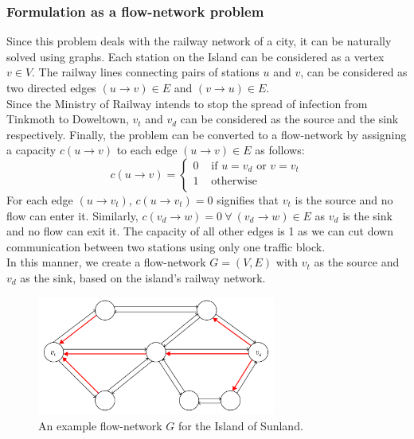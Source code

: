 \documentclass[12pt]{report}
\begin{document}
    \subsubsection*{Formulation as a flow-network problem}
    Since this problem deals with the railway network of a city, it can be naturally solved using graphs.
    Each station on the Island can be considered as a vertex $v \in V$.
    The railway lines connecting pairs of stations $u$ and $v$, can be considered as two directed edges $(u \to v) \in E$ and $(v \to u) \in E$. \\
    Since the Ministry of Railway intends to stop the spread of infection from Tinkmoth to Doweltown, $v_{t}$ and $v_{d}$
    can be considered as the source and the sink respectively.
    Finally, the problem can be converted to a flow-network by assigning a capacity $c(u \to v)$ to each edge $(u \to v) \in E$ as follows:
    \begin{equation}
        \label{eq:capacity}
        c(u \to v) = \begin{cases}
            0 & \text{ if $u = v_{d}$ or $v = v_{t}$} \\
            1 & \text{ otherwise} \\
        \end{cases}
    \end{equation}
    For each edge $(u \to v_{t})$, $c(u \to v_{t}) = 0$ signifies that $v_{t}$ is the source and no flow can enter it.
    Similarly, $c(v_{d} \to w) = 0 \ \forall \ (v_{d} \to w) \in E$ as $v_{d}$ is the sink and no flow can exit it.
    The capacity of all other edges is 1 as we can cut down communication between two stations using only one traffic block. \\
    In this manner, we create a flow-network $G = (V, E)$ with $v_{t}$ as the source and $v_{d}$ as the sink, based on the island's railway network. \hfill
    \begin{figure}[htp]
        \begin{center}
            \includegraphics[width=0.7\textwidth]{network.png}
        \end{center}
        \caption{An example flow-network $G$ for the Island of Sunland.}
        \label{fig:network}
    \end{figure}
\end{document}
